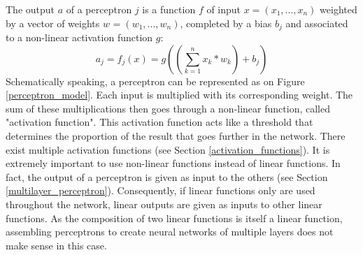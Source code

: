 The output $a$ of a perceptron $j$ is a function $f$ of input $x=(x_{1}, ..., x_{n})$ weighted by a vector of weights $w_{}=(w_{1}, ..., w_{n})$, completed by a bias $b_{j}$ and associated to a non-linear activation function $g$:
\begin{equation}
\label{perceptron_equation}
a_{j} = f_{j}(x) = g((\sum_{k=1}^{n} x_{k} * w_{k}) + b_{j})
\end{equation}
Schematically speaking, a perceptron can be represented as on Figure \ref{perceptron_model}. Each input is multiplied with its corresponding weight. The sum of these multiplications then goes through a non-linear function, called "activation function". This activation function acts like a threshold that determines the proportion of the result that goes further in the network. There exist multiple activation functions (see Section \ref{activation_functions}). It is extremely important to use non-linear functions instead of linear functions. In fact, the output of a perceptron is given as input to the others (see Section \ref{multilayer_perceptron}). Consequently, if linear functions only are used throughout the network, linear outputs are given as inputs to other linear functions. As the composition of two linear functions is itself a linear function, assembling perceptrons to create neural networks of multiple layers does not make sense in this case.





